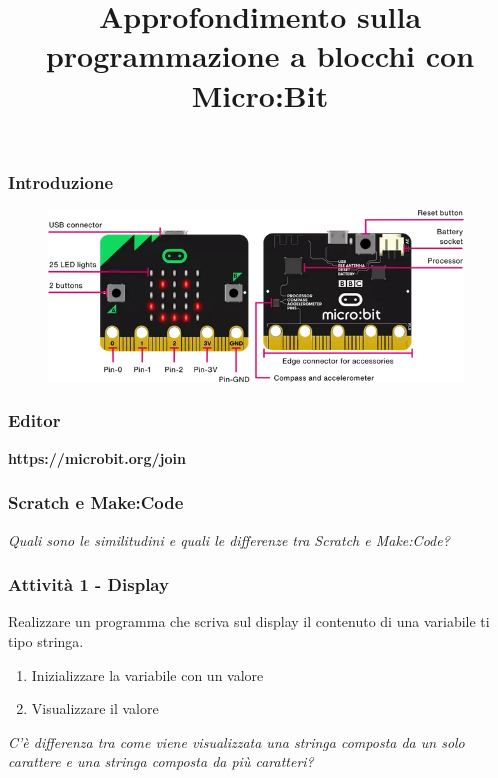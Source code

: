 \documentclass{beamer}
\title{Approfondimento sulla programmazione a blocchi con Micro:Bit}
\begin{document}
\frame{\titlepage}

\begin{frame}
	\frametitle{Introduzione}
	
	\begin{figure}[h]
		\includegraphics[width=11cm]{mbScheme.png}
	\end{figure}

\end{frame}

\begin{frame}
	\frametitle{Editor}
	
	\begin{center}
		\textbf{https://microbit.org/join}
	\end{center}

	
\end{frame}

\begin{frame}
	\frametitle{Scratch e Make:Code}

	\textit{Quali sono le similitudini e quali le differenze tra Scratch e Make:Code?}

\end{frame}

\begin{frame}
	\frametitle{Attività 1 - Display}
	
	Realizzare un programma che scriva sul display il contenuto di una variabile ti tipo stringa.

	\vspace{2em}
	\begin{enumerate}
		\item Inizializzare la variabile con un valore
		\item Visualizzare il valore
	\end{enumerate}

	\vspace{2em}
	\textit{C'è differenza tra come viene visualizzata una stringa composta da un solo carattere e una stringa composta da più caratteri?}

\end{frame}
\end{document}
